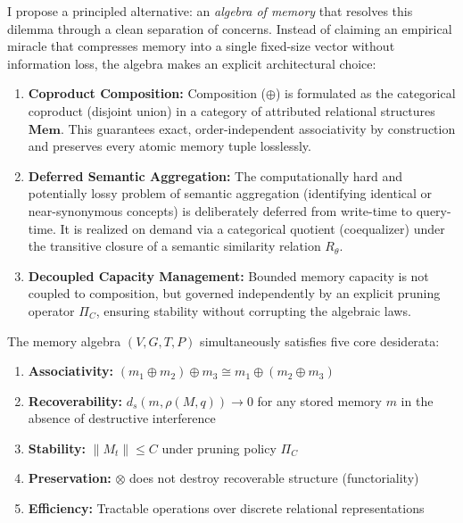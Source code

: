 \documentclass[11pt,a4paper]{article}
\theoremstyle{definition}
\begin{document}
I propose a principled alternative: an \emph{algebra of memory} that resolves this dilemma through a clean separation of concerns. Instead of claiming an empirical miracle that compresses memory into a single fixed-size vector without information loss, the algebra makes an explicit architectural choice:
\begin{enumerate}
    \item \textbf{Coproduct Composition:} Composition ($\oplus$) is formulated as the categorical coproduct (disjoint union) in a category of attributed relational structures $\mathbf{Mem}$. This guarantees exact, order-independent associativity by construction and preserves every atomic memory tuple losslessly.
    \item \textbf{Deferred Semantic Aggregation:} The computationally hard and potentially lossy problem of semantic aggregation (identifying identical or near-synonymous concepts) is deliberately deferred from write-time to query-time. It is realized on demand via a categorical quotient (coequalizer) under the transitive closure of a semantic similarity relation $R_\theta$.
    \item \textbf{Decoupled Capacity Management:} Bounded memory capacity is not coupled to composition, but governed independently by an explicit pruning operator $\Pi_C$, ensuring stability without corrupting the algebraic laws.
\end{enumerate}

The memory algebra $(V, G, T, P)$ simultaneously satisfies five core desiderata:

\begin{enumerate}[label=$\boxed{\text{\Alph*}}$]
    \item \textbf{Associativity:} $(m_1 \oplus m_2) \oplus m_3 \cong m_1 \oplus (m_2 \oplus m_3)$
    \item \textbf{Recoverability:} $d_s(m, \rho(M, q)) \to 0$ for any stored memory $m$ in the absence of destructive interference
    \item \textbf{Stability:} $\|M_t\| \le C$ under pruning policy $\Pi_C$
    \item \textbf{Preservation:} $\otimes$ does not destroy recoverable structure (functoriality)
    \item \textbf{Efficiency:} Tractable operations over discrete relational representations
\end{enumerate}
\end{document}
